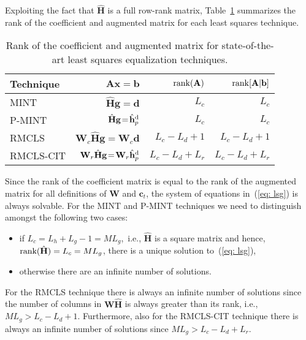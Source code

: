 \documentclass[11pt,draftcls,onecolumn]{IEEEtran}
\begin{document}
Exploiting the fact that $\hat{\mathbf{H}}$ is a full row-rank matrix, Table~\ref{tbl: rank} summarizes the rank of the coefficient and augmented matrix for each least squares technique.
\begin{table}[t!]
  \centering
  \caption{Rank of the coefficient and augmented matrix for state-of-the-art least squares equalization techniques.}
  \label{tbl: rank}
 {\small \begin{tabular}{|l|r|r|r|}
    \hline
    Technique & $\mathbf{A}\mathbf{x} \!=\! \mathbf{b}$ & ${\rm rank}(\mathbf{A})$ & ${\rm rank}[\mathbf{A}|\mathbf{b}]$ \\
    \hline
    MINT & $\hat{\mathbf{H}}\mathbf{g} \!=\! \mathbf{d}$ & $L_c$ & $L_c$ \\
    \hline
    P-MINT & $\hat{\mathbf{H}}\mathbf{g} \!=\! \hat{\mathbf{h}}_p^{\rm d}$ & $L_c$ & $L_c$ \\
    \hline
    RMCLS & $\mathbf{W}_c\hat{\mathbf{H}}\mathbf{g} \!=\! \mathbf{W}_c\mathbf{d}$ & $L_c \!-\! L_d\!+\!1$ & $L_c \!-\!L_d\!+\!1$ \\
    \hline
    RMCLS-CIT & $\mathbf{W}_{r}\hat{\mathbf{H}}\mathbf{g} \!=\! \mathbf{W}_{r}\hat{\mathbf{h}}_p^{\rm d}$ & $L_c \!-\! L_d \!+\! L_r$ & $L_c \!- \!L_d \!+\! L_r$\\
    \hline
  \end{tabular}}
\end{table}
Since the rank of the coefficient matrix is equal to the rank of the augmented matrix for all definitions of $\mathbf{W}$ and $\mathbf{c}_t$, the system of equations in~(\ref{eq: lsg}) is always solvable.
For the MINT and P-MINT techniques we need to distinguish amongst the following two cases:
\begin{itemize}
  \item if $L_c = L_h + L_g -1 = ML_g$,~i.e., $\hat{\mathbf{H}}$ is a square matrix and hence, ${\rm rank(\hat{\mathbf{H}})} =  L_c = ML_g$, there is a unique solution to~(\ref{eq: lsg}),
  \item otherwise there are an infinite number of solutions.
\end{itemize}
For the RMCLS technique there is always an infinite number of solutions since the number of columns in $\mathbf{W}\hat{\mathbf{H}}$ is always greater than its rank, i.e., $M L_g > L_c - L_d +1$.
Furthermore, also for the RMCLS-CIT technique there is always an infinite number of solutions since $M L_g > L_c -L_d+L_r$.
\end{document}

